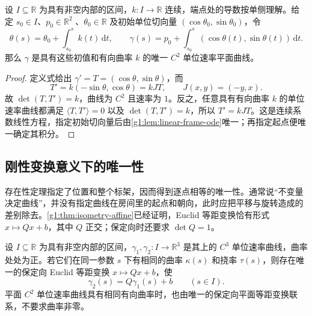 \begin{proposition}
	\label{g1:prop:plane-curve-reconstruction}
	设 \(I\subseteq\mathbb R\) 为具有非空内部的区间，\(k\colon I\rightarrow\mathbb R\) 连续，端点处的导数按单侧理解。给定 \(s_0\in I\)、\(p_0\in\mathbb R^2\) 、\(\theta_0\in\mathbb R\) 及初始单位切向量 \((\cos\theta_0,\sin\theta_0)\)，令
	\[
		\theta(s)=\theta_0+\int_{s_0}^s k(t)\,\mathrm{d}t,\qquad
		\gamma(s)=p_0+\int_{s_0}^s(\cos\theta(t),\sin\theta(t))\,\mathrm{d}t.
	\]
	那么 \(\gamma\) 是具有这些初值和有向曲率 \(k\) 的唯一 \(C^2\) 单位速率平面曲线。
\end{proposition}

\begin{proof}
	定义式给出 \(\gamma'=T=(\cos\theta,\sin\theta)\)，而
	\[
		T'=k(-\sin\theta,\cos\theta)=kJT,\qquad J(x,y)=(-y,x).
	\]
	故 \(\det(T,T')=k\)，曲线为 \(C^2\) 且速率为 \(1\)。反之，任意具有有向曲率 \(k\) 的单位速率曲线都满足 \(\langle T,T'\rangle=0\) 以及 \(\det(T,T')=k\)，所以 \(T'=kJT\)。这是连续系数线性方程，指定初始切向量后由\cref{g1:lem:linear-frame-ode}唯一；再指定起点便唯一确定其积分。
\end{proof}

\subsection{刚性变换意义下的唯一性}
\label{g1:subsec:0702:03}

存在性定理指定了位置和整个标架，因而得到逐点相等的唯一性。通常说“不变量决定曲线”，并没有指定曲线在房间里的起点和朝向，此时应把平移与旋转造成的差别除去。\cref{g1:thm:isometry-affine}已经证明，Euclid 等距变换恰有形式 \(x\mapsto Qx+b\)，其中 \(Q\) 正交；保定向时还要求 \(\det Q=1\)。

\begin{proposition}
	\label{g1:prop:curve-rigid-uniqueness}
	设 \(I\subseteq\mathbb R\) 为具有非空内部的区间，\(\gamma_1,\gamma_2\colon I\rightarrow\mathbb R^3\) 是其上的 \(C^3\) 单位速率曲线，曲率处处为正。若它们在同一参数 \(s\) 下有相同的曲率 \(\kappa(s)\) 和挠率 \(\tau(s)\)，则存在唯一的保定向 Euclid 等距变换 \(x\mapsto Qx+b\)，使
	\[
		\gamma_2(s)=Q\gamma_1(s)+b\qquad(s\in I).
	\]
	平面 \(C^2\) 单位速率曲线具有相同有向曲率时，也由唯一的保定向平面等距变换联系，不要求曲率非零。
\end{proposition}

